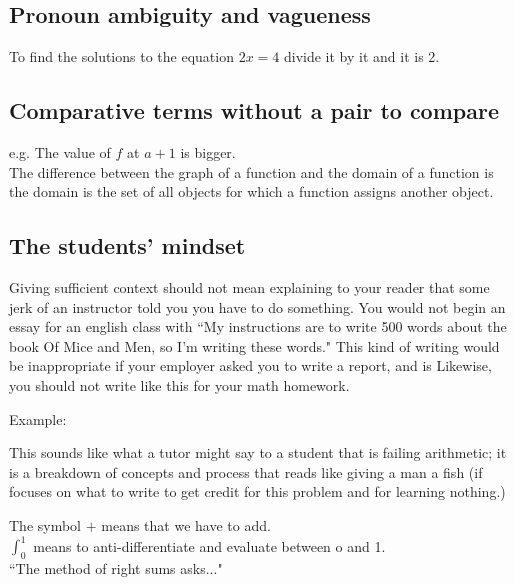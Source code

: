 \documentclass[12pt]{article}
\def\noi{\noindent}
\begin{document}
\subsection{Pronoun ambiguity and vagueness}
To find the solutions to the equation $2x=4$ divide it by it and it is 2.

\subsection{Comparative terms without a pair to compare}
e.g. The value of $f$ at $a+1$ is bigger.\\

\noi The difference between the graph of a function and the domain of a function is the domain is the set of all objects for which a function assigns another object.

\subsection{\bf The students' mindset}
Giving sufficient context should not mean explaining to your reader that some jerk of an instructor told you you have to do something. You would not begin an essay for an english class with ``My instructions are to write 500 words about the book Of Mice and Men, so I'm writing these words." 
This kind of writing would be inappropriate if your employer asked you to write a report, and is 
Likewise, you should not write like this for your math homework.

Example:\\
\begin{quote}
\end{quote}



This sounds like what a tutor might say to a student that is failing arithmetic; it is a breakdown of concepts and process that reads like 
giving a man a fish (if focuses on what to write to get credit for this problem and for learning nothing.)


The symbol $+$ means that we have to add. \\
$\int_0^1$ means to anti-differentiate and evaluate between o and 1. \\
``The method of right sums asks..."\\
\end{document}

